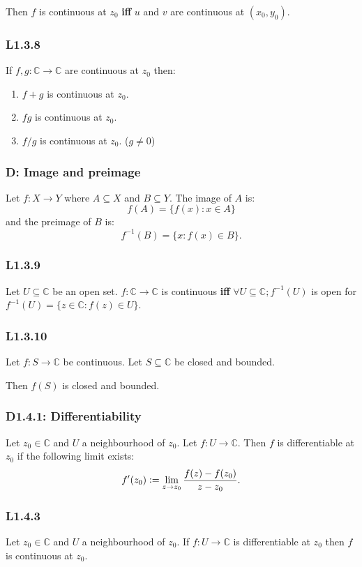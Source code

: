 \documentclass{article}
\newcommand{\deq}{\vcentcolon=}
\begin{document}
\begin{multicols*}{3}
Then $f$ is continuous at $z_0$ \textbf{if{}f}
$u$ and $v$ are continuous at $(x_0,y_0)$.

\subsubsection*{L1.3.8}
If $f,g:\mathbb{C}\rightarrow\mathbb{C}$
are continuous at $z_0$ then:
\begin{enumerate}
    \item $f+g$ is continuous at $z_0$.
    
    \item $fg$ is continuous at $z_0$.
    
    \item $f/g$ is continuous at $z_0$.
    ($g\neq0$)
\end{enumerate}

\subsubsection*{D: Image and preimage}
Let $f:X\rightarrow Y$ where $A\subseteq X$ and $B\subseteq Y$.
The image of $A$ is:
$$f(A)=\{f(x):x\in A\}$$
and the preimage of $B$ is:
$$f^{-1}(B)=\{x:f(x)\in B\}.$$

\subsubsection*{L1.3.9}
Let $U\subseteq\mathbb{C}$ be an open set.
$f:\mathbb{C}\rightarrow\mathbb{C}$ is continuous \textbf{if{}f}
$\forall U\subseteq\mathbb{C}; f^{-1}(U)$ is open
for $f^{-1}(U)=\{z\in\mathbb{C}:f(z)\in U\}$.

\subsubsection*{L1.3.10}
Let $f:S\rightarrow\mathbb{C}$ be continuous.
Let $S\subseteq\mathbb{C}$ be closed and bounded.

Then $f(S)$ is closed and bounded.

\subsubsection*{D1.4.1: Differentiability}
Let $z_0\in\mathbb{C}$ and $U$ a neighbourhood of $z_0$.
Let $f:U\rightarrow\mathbb{C}$. Then $f$ is differentiable at $z_0$ if
the following limit exists:
$$f'(z_0)\deq\lim_{z\rightarrow z_0}\frac{f(z)-f(z_0)}{z-z_0}.$$

\subsubsection*{L1.4.3}
Let $z_0\in\mathbb{C}$ and $U$ a neighbourhood of $z_0$.
If $f:U\rightarrow\mathbb{C}$ is differentiable at $z_0$ then
$f$ is continuous at $z_0$.


\end{multicols*}
\end{document}
